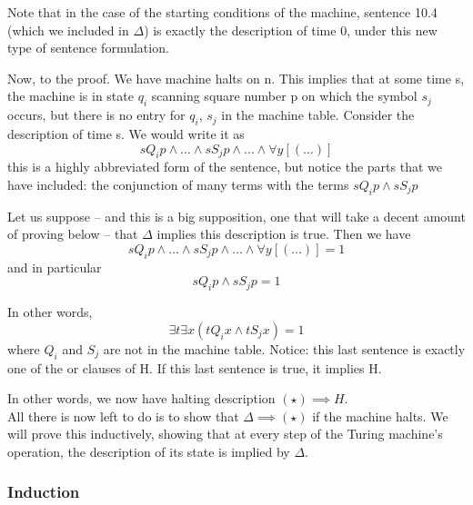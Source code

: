Note that in the case of the starting conditions of the machine, sentence 10.4 (which we included in $\Delta$) is exactly the description of time 0, under this new type of sentence formulation.




Now, to the proof.
We have machine halts on n.
This implies that at some time s, the machine is in state $q_i$ scanning square number p on which the symbol $s_j$ occurs, but there is no entry for $q_i$, $s_j$ in the machine table.
Consider the description of time s. We would write it as 
\[sQ_ip \land \dots \land sS_jp \land \dots \land \forall y [(\dots)]\]
this is a highly abbreviated form of the sentence, but notice the parts that we have included:
	the conjunction of many terms with the terms
	$sQ_ip \land sS_jp$

Let us suppose -- and this is a big supposition, one that will take a decent amount of proving below -- that $\Delta$ implies this description is true. Then we have 
\[sQ_ip \land \dots \land sS_jp \land \dots \land \forall y [(\dots)] = 1 \tag{$\star$}\]
and in particular
\[sQ_ip \land sS_jp = 1\]

In other words, 
\[\exists t \exists x (tQ_ix \land tS_jx) = 1\]
where $Q_i$ and $S_j$ are not in the machine table.
Notice: this last sentence is exactly one of the or clauses of H. If this last sentence is true, it implies H.

In other words, we now have 
halting description $(\star)\implies H$.\\
All there is now left to do is to show that $\Delta \implies (\star)$ if the machine halts.
We will prove this inductively, showing that at every step of the Turing machine's operation, the description of its state is implied by $\Delta$.


\subsubsection{Induction}
